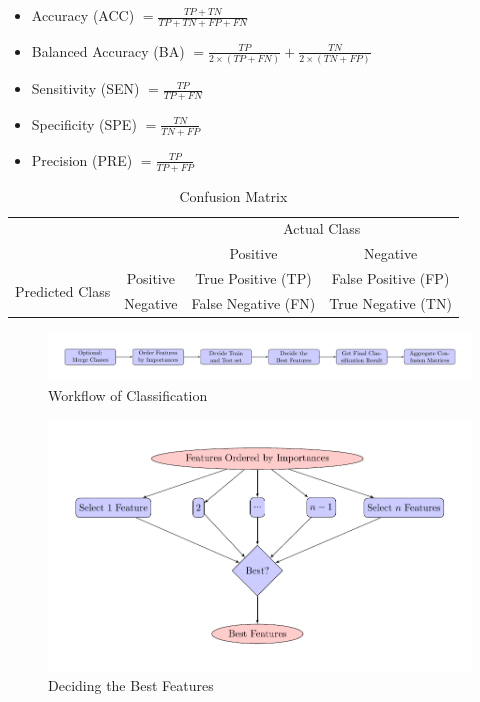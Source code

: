 \documentclass[a4paper]{article}
\begin{document}
            \begin{itemize}
                \item Accuracy (ACC) $ = \frac{TP + TN}{TP + TN + FP + FN}$
                \item Balanced Accuracy (BA) $ = \frac{TP}{2 \times (TP + FN)} + \frac{TN}{2 \times (TN + FP)}$
                \item Sensitivity (SEN) $ = \frac{TP}{TP + FN}$
                \item Specificity (SPE) $ = \frac{TN}{TN + FP}$
                \item Precision (PRE) $ = \frac{TP}{TP + FP}$
            \end{itemize}

            \begin{table}[p]
                \centering
                \caption{Confusion Matrix}
                \label{tb:confusion-matrix}
                \begin{tabular}{c|c|cc}
                    \multicolumn{2}{c|}{\multirow{2}{*}{}} & \multicolumn{2}{c}{Actual Class} \\ \cline{3-4}
                    \multicolumn{2}{c|}{} & Positive & Negative \\ \hline
                    \multirow{2}{*}{Predicted Class} & Positive & True Positive (TP) & False Positive (FP) \\
                    & Negative & False Negative (FN) & True Negative (TN)
                \end{tabular}
            \end{table}

            \begin{figure}[p]
                \centering
                \includegraphics[width=0.8 \linewidth]{figures/Classifier/classifier.pdf}
                \caption{Workflow of Classification}
                \label{fig:classification}
            \end{figure}

            \begin{figure}[p]
                \centering
                \includegraphics[width=0.6 \linewidth]{figures/Classifier/best.pdf}
                \caption{Deciding the Best Features}
                \label{fig:deciding-best}
            \end{figure}
\end{document}
